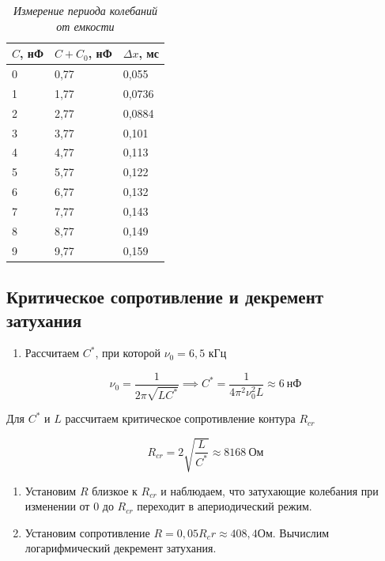 \documentclass[a4paper,12pt]{article}
\begin{document}
\begin{table}[!ht!]
    \centering
    \begin{tabular}{|l|l|l|}
    \hline
        $C$, нФ & $C + C_0$, нФ & $\Delta x$, мс \\ \hline
        0 & 0,77 & 0,055 \\ \hline
        1 & 1,77 & 0,0736 \\ \hline
        2 & 2,77 & 0,0884 \\ \hline
        3 & 3,77 & 0,101 \\ \hline
        4 & 4,77 & 0,113 \\ \hline
        5 & 5,77 & 0,122 \\ \hline
        6 & 6,77 & 0,132 \\ \hline
        7 & 7,77 & 0,143 \\ \hline
        8 & 8,77 & 0,149 \\ \hline
        9 & 9,77 & 0,159 \\ \hline
    \end{tabular}\caption{\textit{Измерение периода колебаний от емкости}}\label{table:1}
\end{table}

\FloatBarrier

\subsection{Критическое сопротивление и декремент затухания}

\begin{enumerate}
    \item Рассчитаем $C^*$, при которой $\nu_0 = 6,5$ кГц
\end{enumerate}

\begin{equation*}
    \nu_0 = \frac{1}{2 \pi \sqrt{L C^*}} \implies C^* = \frac{1}{4 \pi^2 \nu_0^2 L} \approx 6 \ \text{нФ}
\end{equation*}

Для $C^*$ и $L$ рассчитаем критическое сопротивление контура $R_{cr}$

\begin{equation*}
    R_{cr} = 2 \sqrt{\frac{L}{C^*}} \approx 8168 \ \text{Ом}
\end{equation*}

\begin{enumerate}[resume]
    \item Установим $R$ близкое к $R_{cr}$ и наблюдаем, что затухающие колебания при изменении от $0$ до $R_{cr}$ переходит в апериодический режим.
    \item Установим сопротивление $R = 0,05 R_cr \approx 408,4 \text{Ом}$. Вычислим логарифмический декремент затухания.
\end{enumerate}
\end{document}
